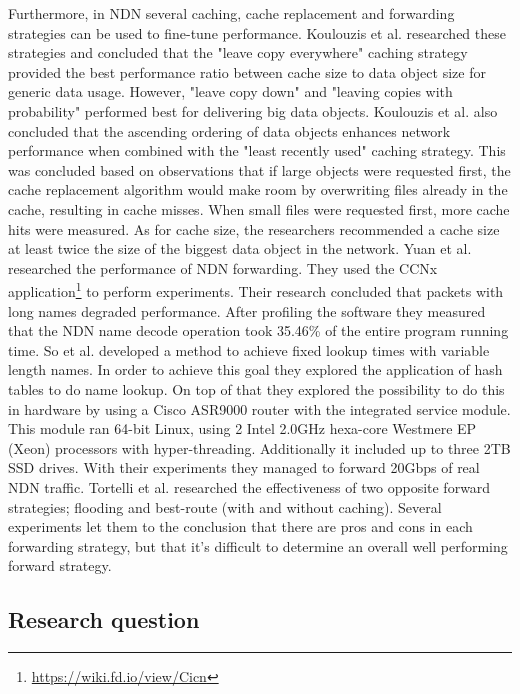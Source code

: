 Furthermore, in NDN several caching, cache replacement and forwarding strategies can be used to fine-tune performance. Koulouzis et al. researched these strategies and concluded that the "leave copy everywhere" caching strategy provided the best performance ratio between cache size to data object size for generic data usage. However, "leave copy down" and "leaving copies with probability" performed best for delivering big data objects. Koulouzis et al. also concluded that the ascending ordering of data objects enhances network performance when combined with the "least recently used" caching strategy. This was concluded based on observations that if large objects were requested first, the cache replacement algorithm would make room by overwriting files already in the cache, resulting in cache misses. When small files were requested first, more cache hits were measured. As for cache size, the researchers recommended a cache size at least twice the size of the biggest data object in the network. Yuan et al. \cite{yuan2012scalable} researched the performance of NDN forwarding. They used the CCNx application\footnote{\url{https://wiki.fd.io/view/Cicn}} to perform experiments. Their research concluded that packets with long names degraded performance. After profiling the software they measured that the NDN name decode operation took 35.46\% of the entire program running time. So et al. \cite{so2013named} developed a method to achieve fixed lookup times with variable length names. In order to achieve this goal they explored the application of hash tables to do name lookup. On top of that they explored the possibility to do this in hardware by using a Cisco ASR9000 router with the integrated service module. This module ran 64-bit Linux, using 2 Intel 2.0GHz hexa-core Westmere EP (Xeon) processors with hyper-threading. Additionally it included up to three 2TB SSD drives. With their experiments they managed to forward 20Gbps of real NDN traffic. Tortelli et al. \cite{tortelli2013performance} researched the effectiveness of two opposite forward strategies; flooding and best-route (with and without caching). Several experiments let them to the conclusion that there are pros and cons in each forwarding strategy, but that it's difficult to determine an overall well performing forward strategy.

\subsection{Research question}
\label{introduction-research-question}

